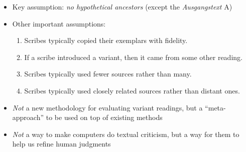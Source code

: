 \documentclass[10pt]{beamer}
\begin{document}
	\begin{frame}
		\begin{itemize}
			\item Key assumption: \emph{no hypothetical ancestors} (except the \emph{Ausgangstext} A)
			\item Other important assumptions:
			\begin{enumerate}
				\item Scribes typically copied their exemplars with fidelity.
				\item If a scribe introduced a variant, then it came from some other reading.
				\item Scribes typically used fewer sources rather than many.
				\item Scribes typically used closely related sources rather than distant ones.
			\end{enumerate}
		\end{itemize}
	\end{frame}
	\begin{frame}
		\begin{itemize}
			\item \emph{Not} a new methodology for evaluating variant readings, but a ``meta-approach'' to be used on top of existing methods			
			\item \emph{Not} a way to make computers do textual criticism, but a way for them to help us refine human judgments
		\end{itemize}
	\end{frame}
\end{document}
